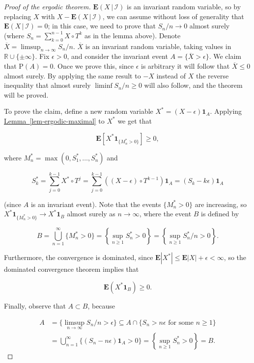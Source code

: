 \documentclass[11pt]{report}
\newcommand{\R}{\mathbb{R}}
\theoremstyle{plain}
\theoremstyle{definition}
\begin{document}
\begin{proof}[Proof of the ergodic theorem]
$\mathbf{E}\left(X\,|\,\mathcal{I}\right)$ is an
invariant random variable, so by replacing $X$ with
$X-\mathbf{E}\left(X\,|\,\mathcal{I}\right)$, we can
assume without loss of generality that
$\mathbf{E}\left(X\,|\,\mathcal{I}\right)=0$; in this
case, we need to prove that $S_n/n\to 0$ almost
surely (where $S_n=\sum_{k=0}^{n-1} X\circ T^k$ as in
the lemma above). Denote
$\overline{X} = \limsup_{n\to\infty} S_n/n$.
$\overline{X}$ is an invariant random variable,
taking values in $\R\cup\{\pm\infty\}$. Fix
$\epsilon>0$, and consider the invariant event
$A= \{ \overline{X} > \epsilon \}$. We claim that
$\mathrm{P}(A)=0$. Once we prove this, since
$\epsilon$ is arbitrary it will follow that
$\overline{X}\le 0$ almost surely. By applying the
same result to $-X$ instead of $X$ the reverse
inequality that almost surely $\liminf S_n/n\ge 0$
will also follow, and the theorem will be proved.

To prove the claim, define a new random variable
$X^* = (X-\epsilon)\mathbf{1}_{A}$. Applying \texorpdfstring{\hyperref[lem-ergodic-maximal]{Lemma~\ref*{lem-ergodic-maximal}}}{Lemma} to $X^*$ we get that

\[
\mathbf{E}\left[X^* \mathbf{1}_{\{ M_n^*>0\}}\right] \ge 0,
\]

\noindent where $M_n^* = \max(0,S_1^*,\ldots,S_n^*)$ and

\[
S_k^* = \sum_{j=0}^{k-1} X^*\circ T^j = \sum_{j=0}^{k-1} \left((X-\epsilon)\circ T^{k-1}\right) \mathbf{1}_A = (S_k-k\epsilon)\mathbf{1}_A
\]

\noindent (since $A$ is an invariant event). Note that the
events $\{M_n^* > 0\}$ are increasing, so
$X^* \mathbf{1}_{\{ M_n^*>0\}} \to X^* \mathbf{1}_B$
almost surely as $n\to\infty$, where the event $B$ is
defined by

\[
B=\bigcup_{n=1}^\infty \{M_n^* > 0 \} =
\left\{ \sup_{n\ge 1} S_n^* > 0 \right\}
= \left\{ \sup_{n\ge 1} S_n^*/n > 0 \right\}.
\]

\noindent Furthermore, the convergence is dominated, since
$\mathbf{E}|X^*| \le \mathbf{E}|X|+\epsilon<\infty$,
so the dominated convergence theorem implies that

\[
\mathbf{E}(X^* \mathbf{1}_B) \ge 0.
\]

\noindent Finally, observe that $A\subset B$, because

\begin{align*}
A&=\{\limsup_{n\to\infty} S_n/n>\epsilon\} \subseteq A \cap \{ S_n>n\epsilon \textrm{ for some }n\ge 1\} \\
&= \bigcup_{n=1}^\infty \{ (S_n-n\epsilon)\mathbf{1}_A > 0 \} = \left\{ \sup_{n\ge 1} S_n^*>0 \right\} = B.
\end{align*}


\end{proof}
\end{document}
